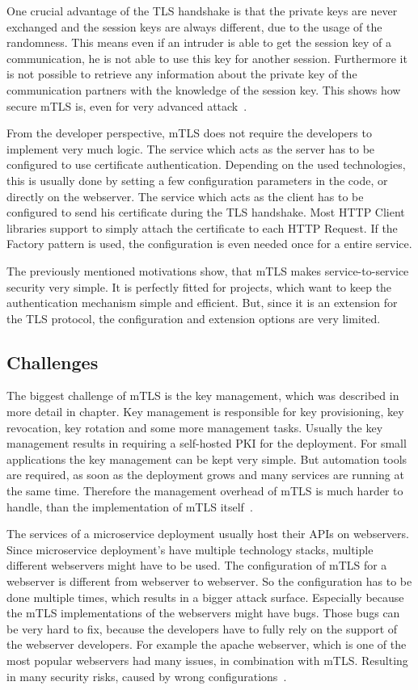 One crucial advantage of the TLS handshake is that the private keys are never exchanged and the session keys are always different, due to the usage of the randomness.
This means even if an intruder is able to get the session key of a communication, he is not able to use this key for another session.
Furthermore it is not possible to retrieve any information about the private key of the communication partners with the knowledge of the session key.
This shows how secure mTLS is, even for very advanced attack~\cite{parsovs2013practical}.

From the developer perspective, mTLS does not require the developers to implement very much logic.
The service which acts as the server has to be configured to use certificate authentication.
Depending on the used technologies, this is usually done by setting a few configuration parameters in the code, or directly on the webserver.
The service which acts as the client has to be configured to send his certificate during the TLS handshake.
Most HTTP Client libraries support to simply attach the certificate to each HTTP Request.
If the Factory pattern is used, the configuration is even needed once for a entire service.

The previously mentioned motivations show, that mTLS makes service-to-service security very simple.
It is perfectly fitted for projects, which want to keep the authentication mechanism simple and efficient.
But, since it is an extension for the TLS protocol, the configuration and extension options are very limited.

\subsection{Challenges}
The biggest challenge of mTLS is the key management, which was described in more detail in chapter.
Key management is responsible for key provisioning, key revocation, key rotation and some more management tasks.
Usually the key management results in requiring a self-hosted PKI for the deployment.
For small applications the key management can be kept very simple.
But automation tools are required, as soon as the deployment grows and many services are running at the same time.
Therefore the management overhead of mTLS is much harder to handle, than the implementation of mTLS itself~\cite{dias2020microservices}.

The services of a microservice deployment usually host their APIs on webservers.
Since microservice deployment's have multiple technology stacks, multiple different webservers might have to be used.
The configuration of mTLS for a webserver is different from webserver to webserver.
So the configuration has to be done multiple times, which results in a bigger attack surface.
Especially because the mTLS implementations of the webservers might have bugs.
Those bugs can be very hard to fix, because the developers have to fully rely on the support of the webserver developers. 
For example the apache webserver, which is one of the most popular webservers had many issues, in combination with mTLS.
Resulting in many security risks, caused by wrong configurations~\cite{parsovs2013practical}. 


